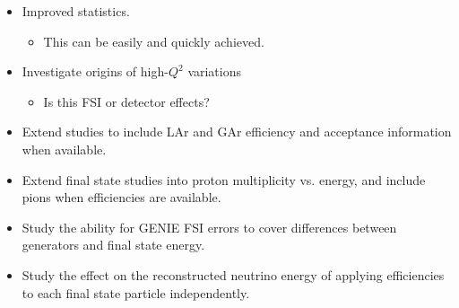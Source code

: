 \documentclass[12pt]{article}
\begin{document}
\begin{itemize}

\item Improved statistics.
	\begin{itemize}
		\item This can be easily and quickly achieved.
	\end{itemize}
\item Investigate origins of high-$Q^2$ variations
	\begin{itemize}
		\item Is this FSI or detector effects?
	\end{itemize}
\item Extend studies to include LAr and GAr efficiency and acceptance information when available.
\item Extend final state studies into proton multiplicity vs. energy, and include pions when efficiencies are available.
\item Study the ability for GENIE FSI errors to cover differences between generators and final state energy.
\item Study the effect on the reconstructed neutrino energy of applying efficiencies to each final state particle independently.

\end{itemize}


\appendix

%






\end{document}
